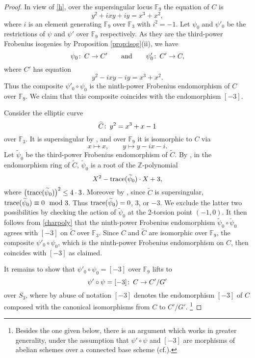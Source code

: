 \documentclass{gtpart}
\theoremstyle{definition}
\theoremstyle{remark}
\def\co{\colon\thinspace}
\newcommand{\mb}[1]{\mathbb{#1}}
\newcommand{\cf}{cf.\thinspace}
\newcommand{\BF}{{\mb F}}
\newcommand{\BZ}{{\mb Z}}
\newcommand{\TC}{\widetilde{C}}
\newcommand{\TP}{\widetilde{\psi}}
\newcommand{\md}{~~{\rm mod}~}
\newcommand{\ad}{{\rm and}}
\newcommand{\isog}[1]{Proposition \ref{prop:isog}\thinspace (#1)}
\begin{document}
\begin{proof}
 In view of \eqref{h}, over the supersingular locus $\BF_9$ the equation of $C$ is 
 \[
  y^2 + i x y + i y = x^3 + x^2, 
 \]
 where $i$ is an element generating $\BF_9$ over $\BF_3$ with $i^2 = -1$.  
 Let $\psi_0$ and $\psi'_0$ be the restrictions of $\psi$ and $\psi'$ over $\BF_9$ respectively.  
 As they are the third-power Frobenius isogenies by \isog{ii}, we have 
 \[
  \psi_0 \co C \to C' \qquad \ad \qquad \psi'_0 \co C' \to C, 
 \]
 where $C'$ has equation 
 \[
  y^2 - i x y - i y = x^3 + x^2.  
 \]
 Thus the composite $\psi'_0 \circ \psi_0$ is the ninth-power Frobenius endomorphism of $C$ over $\BF_9$.  
 We claim that this composite coincides with the endomorphism $[-3]$.  

 Consider the elliptic curve 
 \[
  \TC \co y^2 = x^3 + x - 1 
 \]
 over $\BF_3$.  It is supersingular by \cite[V.4.1a]{AEC}, and over $\BF_9$ it is isomorphic to $C$ via 
 \[
  x \mapsto x, \qquad y \mapsto y - i x - i.  
 \]
 Let $\TP_0$ be the third-power Frobenius endomorphism of $\TC$.  
 By \cite[Theorem 2.6.3]{KM}, in the endomorphism ring of $\TC$, $\TP_0$ is a root of the $\BZ$-polynomial 
 \begin{equation}
 \label{charpoly}
  X^2 - {\rm trace}(\TP_0) \cdot X + 3, 
 \end{equation}
 where $\big( {\rm trace}(\TP_0) \big)^2 \leq 4 \cdot 3$.  
 Moreover by \cite[Exercise 5.10a]{AEC}, since $\TC$ is supersingular, ${\rm trace}(\TP_0) \equiv 0 \md 3$.  
 Thus ${\rm trace}(\TP_0) = 0$, 3, or $-3$.  
 We exclude the latter two possibilities by checking the action of $\TP_0$ at the 2-torsion point $(-1,0)$.  
 It then follows from \eqref{charpoly} that the ninth-power Frobenius endomorphism $\TP_0 \circ \TP_0$ agrees with $[-3]$ on $\TC$ over $\BF_3$.  
 Since $C$ and $\TC$ are isomorphic over $\BF_9$, the composite $\psi'_0 \circ \psi_0$, 
 which is the ninth-power Frobenius endomorphism on $C$, then coincides with $[-3]$ as claimed.  

 It remains to show that $\psi'_0 \circ \psi_0 = [-3]$ over $\BF_9$ lifts to 
 \[
  \psi' \circ \psi = [-3] \co C \to C'/G' 
 \]
 over $S_3$, where by abuse of notation $[-3]$ denotes the endomorphism $[-3]$ of $C$ composed with the canonical isomorphisms from $C$ to $C'/G'$.  
 \footnote{Besides the one given below, there is an argument which works in greater generality, 
 under the assumption that $\psi' \circ \psi$ and $[-3]$ are morphisms of abelian schemes over a connected base scheme 
 (\cf \cite[Proposition 6.1 and Corollary 6.2]{GIT}).  }


\end{proof}
\end{document}
